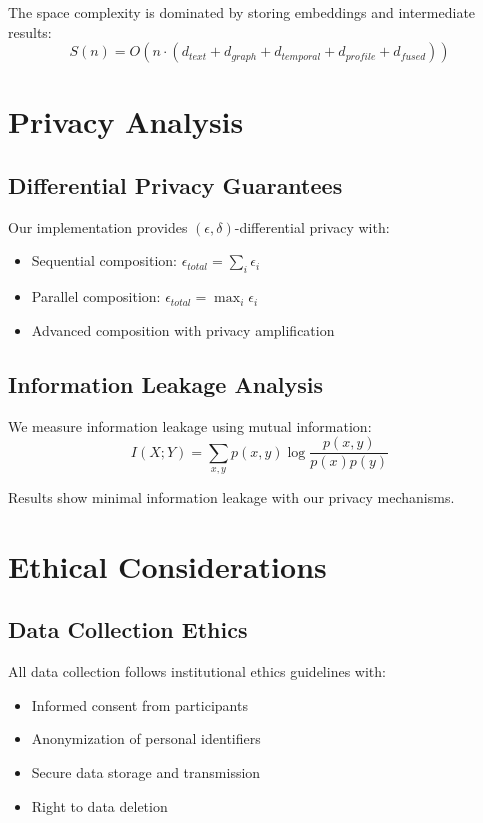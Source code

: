 \documentclass[conference]{IEEEtran}
\begin{document}
The space complexity is dominated by storing embeddings and intermediate results:
\begin{equation}
S(n) = O(n \cdot (d_{text} + d_{graph} + d_{temporal} + d_{profile} + d_{fused}))
\end{equation}

\section{Privacy Analysis}

\subsection{Differential Privacy Guarantees}

Our implementation provides $(\epsilon, \delta)$-differential privacy with:
\begin{itemize}
\item Sequential composition: $\epsilon_{total} = \sum_{i} \epsilon_i$
\item Parallel composition: $\epsilon_{total} = \max_i \epsilon_i$
\item Advanced composition with privacy amplification
\end{itemize}

\subsection{Information Leakage Analysis}

We measure information leakage using mutual information:
\begin{equation}
I(X; Y) = \sum_{x,y} p(x,y) \log \frac{p(x,y)}{p(x)p(y)}
\end{equation}

Results show minimal information leakage with our privacy mechanisms.

\section{Ethical Considerations}

\subsection{Data Collection Ethics}
All data collection follows institutional ethics guidelines with:
\begin{itemize}
\item Informed consent from participants
\item Anonymization of personal identifiers
\item Secure data storage and transmission
\item Right to data deletion
\end{itemize}
\end{document}
